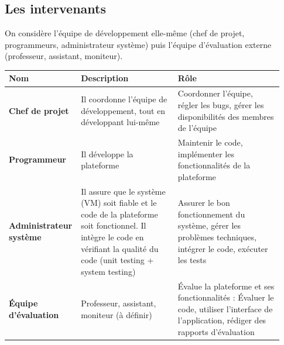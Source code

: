 \documentclass[11pt]{article}
\begin{document}
\newpage
\subsection{Les intervenants}


On considère l'équipe de développement elle-même (chef de projet, programmeurs, administrateur système) puis l’équipe d’évaluation externe (professeur, assistant, moniteur).


\begin{center}
	\begin{tabular}{|L{0.2\linewidth}|L{0.35\linewidth}|L{0.38\linewidth}|}
		\hline
		\textbf{Nom} & \textbf{Description} & \textbf{Rôle} \\
		\hline
		\textbf{Chef de projet} & Il coordonne l’équipe de développement, tout en développant lui-même & Coordonner l’équipe, régler les bugs, gérer les disponibilités des membres de l’équipe \\
		\hline
		\textbf{Programmeur} & Il développe la plateforme & Maintenir le code, implémenter les fonctionnalités de la plateforme \\
		\hline
		\textbf{Administrateur système} & Il assure que le système (VM) soit fiable et le code de la plateforme soit fonctionnel. Il intègre le code en vérifiant la qualité du code (unit testing + system testing) & Assurer le bon fonctionnement du système, gérer les problèmes techniques, intégrer le code, exécuter les tests \\
		\hline
		\textbf{Équipe d’évaluation} & Professeur, assistant, moniteur (à définir) & Évalue la plateforme et ses fonctionnalités : Évaluer le code, utiliser l’interface de l’application, rédiger des rapports d’évaluation \\

\end{tabular}
\end{center}
\end{document}

